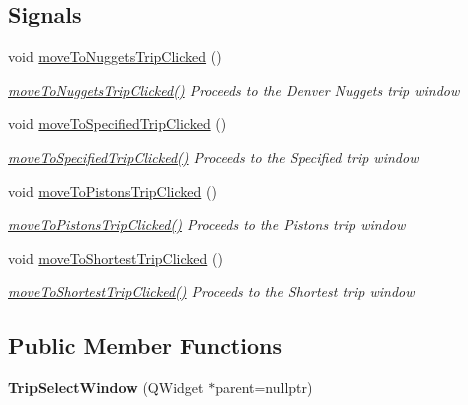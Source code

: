 \subsection*{Signals}
\begin{DoxyCompactItemize}
\item 
void \mbox{\hyperlink{class_trip_select_window_ae012956bf7e4a6a95e1195de49a964b6}{move\+To\+Nuggets\+Trip\+Clicked}} ()
\begin{DoxyCompactList}\small\item\em \mbox{\hyperlink{class_trip_select_window_ae012956bf7e4a6a95e1195de49a964b6}{move\+To\+Nuggets\+Trip\+Clicked()}} Proceeds to the Denver Nuggets trip window \end{DoxyCompactList}\item 
void \mbox{\hyperlink{class_trip_select_window_aee52b96823637577f840e23382ad89c9}{move\+To\+Specified\+Trip\+Clicked}} ()
\begin{DoxyCompactList}\small\item\em \mbox{\hyperlink{class_trip_select_window_aee52b96823637577f840e23382ad89c9}{move\+To\+Specified\+Trip\+Clicked()}} Proceeds to the Specified trip window \end{DoxyCompactList}\item 
void \mbox{\hyperlink{class_trip_select_window_a42a599fbfb64df27a27a0cf3b44592db}{move\+To\+Pistons\+Trip\+Clicked}} ()
\begin{DoxyCompactList}\small\item\em \mbox{\hyperlink{class_trip_select_window_a42a599fbfb64df27a27a0cf3b44592db}{move\+To\+Pistons\+Trip\+Clicked()}} Proceeds to the Pistons trip window \end{DoxyCompactList}\item 
void \mbox{\hyperlink{class_trip_select_window_a6381ba254b16b743dbeb0f2f3f491e19}{move\+To\+Shortest\+Trip\+Clicked}} ()
\begin{DoxyCompactList}\small\item\em \mbox{\hyperlink{class_trip_select_window_a6381ba254b16b743dbeb0f2f3f491e19}{move\+To\+Shortest\+Trip\+Clicked()}} Proceeds to the Shortest trip window \end{DoxyCompactList}\end{DoxyCompactItemize}
\subsection*{Public Member Functions}
\begin{DoxyCompactItemize}
\item 
\mbox{\label{class_trip_select_window_a016dc4c235d6fdb546b23e4af62554f1}} 
{\bfseries Trip\+Select\+Window} (Q\+Widget $\ast$parent=nullptr)
\end{DoxyCompactItemize}


